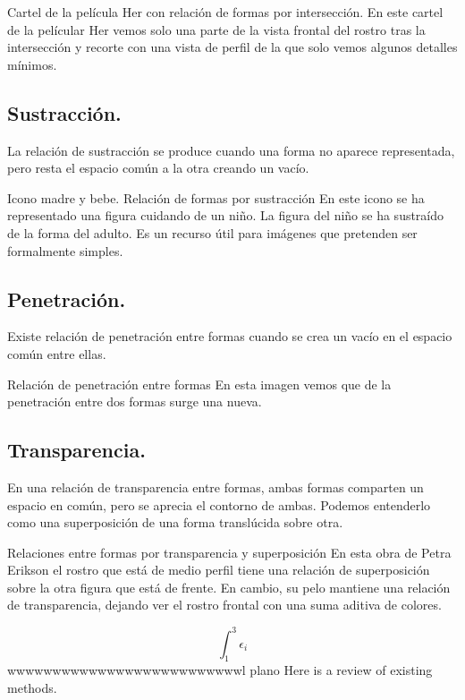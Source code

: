 \documentclass[
  16pt,
]{krantz}
\theoremstyle{definition}
\theoremstyle{definition}
\theoremstyle{definition}
\theoremstyle{definition}
\theoremstyle{remark}
\begin{document}
Cartel de la película Her con relación de formas por intersección.
En este cartel de la películar Her vemos solo una parte de la vista frontal del rostro tras la intersección y recorte con una vista de perfil de la que solo vemos algunos detalles mínimos.

\hypertarget{sustracciuxf3n.}{%
\subsection{Sustracción.}\label{sustracciuxf3n.}}

La relación de sustracción se produce cuando una forma no aparece representada, pero resta el espacio común a la otra creando un vacío.

Icono madre y bebe. Relación de formas por sustracción
En este icono se ha representado una figura cuidando de un niño. La figura del niño se ha sustraído de la forma del adulto. Es un recurso útil para imágenes que pretenden ser formalmente simples.

\hypertarget{penetraciuxf3n.}{%
\subsection{Penetración.}\label{penetraciuxf3n.}}

Existe relación de penetración entre formas cuando se crea un vacío en el espacio común entre ellas.

Relación de penetración entre formas
En esta imagen vemos que de la penetración entre dos formas surge una nueva.

\hypertarget{transparencia.}{%
\subsection{Transparencia.}\label{transparencia.}}

En una relación de transparencia entre formas, ambas formas comparten un espacio en común, pero se aprecia el contorno de ambas. Podemos entenderlo como una superposición de una forma translúcida sobre otra.

Relaciones entre formas por transparencia y superposición
En esta obra de Petra Erikson el rostro que está de medio perfil tiene una relación de superposición sobre la otra figura que está de frente. En cambio, su pelo mantiene una relación de transparencia, dejando ver el rostro frontal con una suma aditiva de colores.

\[\int_1^3\epsilon_i\]
wwwwwwwwwwwwwwwwwwwwwwwwwwl plano Here is a review of existing methods.
\end{document}
